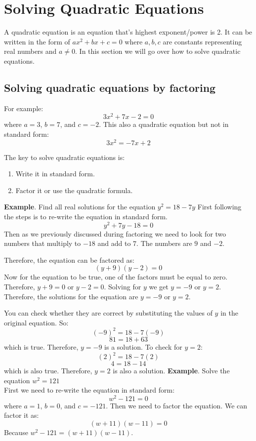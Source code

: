 
\section{Solving Quadratic Equations}
\label{sec:quadratic-equations}
A quadratic equation is an equation that's highest exponent/power is 2. It can be written in the form of $ax^2+bx+c=0$ where $a,b,c$ are constants representing real numbers and $a \neq 0$. In this section we will go over how to solve quadratic equations.

\subsection{Solving quadratic equations by factoring}
For example: 
$$ 3x^2+7x-2=0$$ where $a=3$, $b=7$, and $c=-2$.
This also a quadratic equation but not in standard form: 
$$ 3x^2=-7x+2$$

The key to solve quadratic equations is: 
\begin{enumerate}
    \item Write it in standard form.
    \item Factor it or use the quadratic formula.
\end{enumerate}

\textbf{Example}. Find all real solutions for the equation $y^2=18-7y$
First following the steps is to re-write the equation in standard form.
$$y^2+7y-18=0$$
Then as we previously discussed during factoring we need to look for two numbers that multiply to $-18$ and add to $7$. The numbers are $9$ and $-2$.

Therefore, the equation can be factored as:
$$(y+9)(y-2)=0$$
Now for the equation to be true, one of the factors must be equal to zero. Therefore, $y+9=0$ or $y-2=0$. Solving for $y$ we get $y=-9$ or $y=2$. Therefore, the solutions for the equation are $y=-9$ or $y=2$.

You can check whether they are correct by substituting the values of $y$ in the original equation. So:
$$(-9)^2=18-7(-9)$$
$$81=18+63$$ which is true. Therefore, $y=-9$ is a solution.
To check for $y=2$:
$$(2)^2=18-7(2)$$
$$4=18-14$$ which is also true. Therefore, $y=2$ is also a solution.
\newpage
\textbf{Example}. Solve the equation $w^2=121$ \\
First we need to re-write the equation in standard form:
$$w^2-121=0$$ where $a=1$, $b=0$, and $c=-121$.
Then we need to factor the equation. We can factor it as:
$$(w+11)(w-11)=0$$ Because $w^2-121=(w+11)(w-11)$. \\

